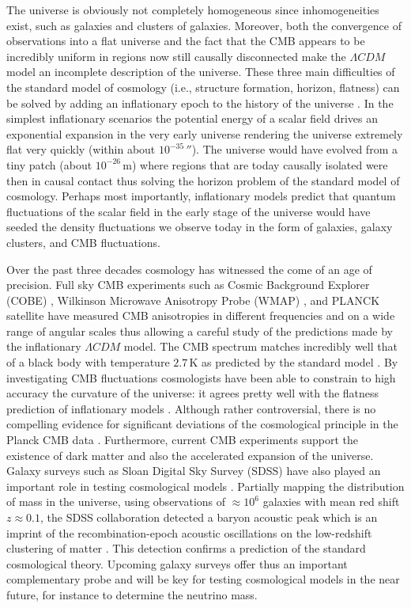 The universe is obviously not completely homogeneous since inhomogeneities exist, such as galaxies and clusters of galaxies. Moreover, both the convergence of observations into a flat universe and the fact that the CMB appears to be incredibly uniform in regions now still causally disconnected  make the $\Lambda CDM$ model an incomplete description of the universe. These three main difficulties of the standard model of cosmology (i.e., structure formation, horizon, flatness) can be solved by adding an inflationary epoch to the history of the universe \cite{Guth:2005zr}. In the simplest inflationary scenarios the potential energy of a scalar field drives an exponential expansion in the very early universe rendering the universe extremely flat very quickly (within about $10^{-35}\, \second$). The universe would have evolved from a tiny patch (about $10^{-26}\,\mathrm{m}$) where regions that are today causally isolated were then in causal contact thus solving the horizon problem of the standard model of cosmology. Perhaps most importantly, inflationary models predict that quantum fluctuations of the scalar field in the early stage of the universe would have seeded the density fluctuations we observe today in the form of galaxies, galaxy clusters, and CMB fluctuations.

Over the past three decades cosmology has witnessed the come of an age of precision. Full sky CMB experiments such as Cosmic Background Explorer (COBE) \cite{Smoot:1992td}, Wilkinson Microwave Anisotropy Probe (WMAP) \cite{Bennett:2003bz}, and PLANCK satellite \cite{Ade:2013sjv} have measured CMB anisotropies in different frequencies and on a wide range of angular scales thus allowing a careful study of the predictions made by the inflationary $\Lambda CDM$ model. The CMB spectrum matches incredibly well that of a black body with temperature $2.7\,\mathrm{K}$ as predicted by the standard model \cite{Alpher:1950zz}. By investigating CMB fluctuations cosmologists have been able to constrain to high accuracy the curvature of the universe: it agrees pretty well with the flatness prediction of inflationary models \cite{Ade:2015xua}. Although rather controversial, there is no compelling evidence for significant deviations of the cosmological principle in the Planck CMB data \cite{Ade:2015hxq}. Furthermore, current CMB experiments support the existence of dark matter and also the accelerated expansion of the universe. Galaxy surveys such as Sloan Digital Sky Survey (SDSS) have also played an important role in testing cosmological models \cite{Tegmark:2003uf,Tegmark:2003ud}. Partially mapping the distribution of mass in the universe, using observations of $\approx 10^6$ galaxies with mean red shift $z \approx 0.1$, the SDSS collaboration detected a baryon acoustic peak which is an imprint of the recombination-epoch acoustic oscillations on the low-redshift clustering of matter \cite{Eisenstein:2005su}. This detection confirms a prediction of the standard cosmological theory. Upcoming galaxy surveys offer thus an important complementary probe and will be key for testing cosmological models in the near future, for instance to determine the neutrino mass.

